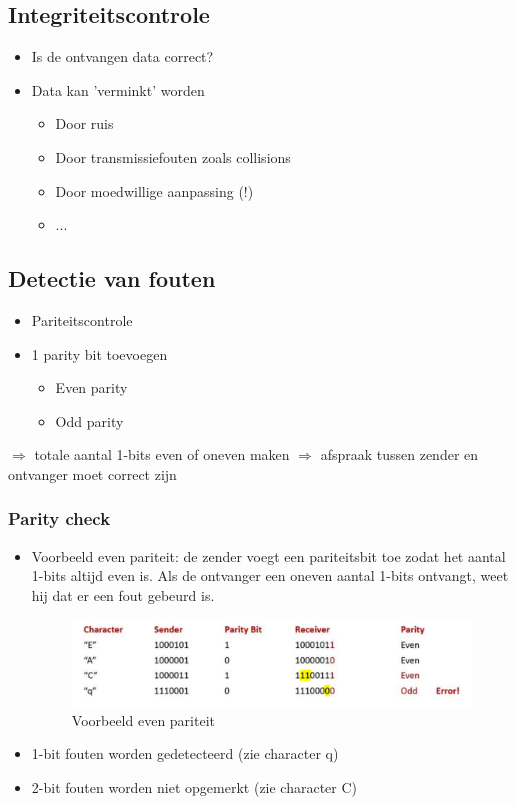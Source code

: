 \documentclass{article}
\begin{document}
\subsection{Integriteitscontrole}
\begin{itemize}
    \item Is de ontvangen data correct?
    \item Data kan 'verminkt' worden
    \begin{itemize}
        \item Door ruis
        \item Door transmissiefouten zoals collisions
        \item Door moedwillige aanpassing (!)
        \item ...
    \end{itemize}
\end{itemize}

\subsection{Detectie van fouten}
\begin{itemize}
    \item Pariteitscontrole
    \item 1 parity bit toevoegen
    \begin{itemize}
        \item Even parity
        \item Odd parity
    \end{itemize}
\end{itemize}

$\Rightarrow$ totale aantal 1-bits even of oneven maken
$\Rightarrow$ afspraak tussen zender en ontvanger moet correct zijn

\subsubsection{Parity check}
\begin{itemize}
    \item Voorbeeld even pariteit: de zender voegt een pariteitsbit toe zodat het aantal 1-bits altijd even is. 
    Als de ontvanger een oneven aantal 1-bits ontvangt, weet hij dat er een fout gebeurd is.
\begin{figure}[H]
    \centering
    \includegraphics[width=\textwidth]{Screenshot_20200420_115619.png}
    \caption{Voorbeeld even pariteit}
\end{figure}
    \item 1-bit fouten worden gedetecteerd (zie character q)
    \item 2-bit fouten worden niet opgemerkt (zie character C)
\end{itemize}
\end{document}
